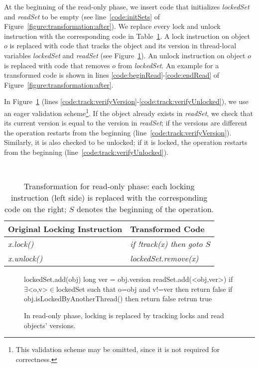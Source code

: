 At the beginning of the read-only phase, we insert code that initializes \emph{lockedSet} and \emph{readSet} to be empty (see  line~\ref{code:initSets} of Figure~\ref{figure:transformation:after}).
We replace every lock and unlock instruction with the corresponding code in Table~\ref{Ta:readOnlyTransformation}.
A lock instruction on object $o$ is replaced with code that tracks the object and its version in
thread-local variables \emph{lockedSet} and \emph{readSet} (see Figure~\ref{figure::track}).
An unlock instruction on object $o$ is replaced with code that removes $o$ from \emph{lockedSet}.
An example for a transformed code is shown in lines \ref{code:beginRead}-\ref{code:endRead} of Figure~\ref{figure:transformation:after}.

In Figure~\ref{figure::track} (lines \ref{code:track:verifyVersion}-\ref{code:track:verifyUnlocked}), we use an eager validation scheme\footnote{
This validation scheme may be omitted, since it is not required for correctness.
}.
If the object already exists in \emph{readSet}, we check that its current version is equal
to the version in \emph{readSet}; if the versions are different  the operation restarts from the beginning (line~\ref{code:track:verifyVersion}).
Similarly, it is also checked to be unlocked; if it is locked, the operation restarts from the beginning (line~\ref{code:track:verifyUnlocked}).



\begin{table}
\scriptsize
\ttfamily
{\tt
\begin{center}
\begin{tabular}{|l|l|}
\hline
\textbf{Original Locking Instruction} & \textbf{Transformed Code}\\
\hline
\textit{x.lock()}&
\textit{if !track(x) then goto $S$}
\\
\hline
\textit{x.unlock()}&
\textit{lockedSet.remove(x)}
\\
\hline
\end{tabular}
\end{center}
}
\caption{Transformation for read-only phase:
each locking instruction (left side) is replaced with the corresponding code on the right;
 $S$  denotes the beginning of the operation.
}
\label{Ta:readOnlyTransformation}
\end{table}

\begin{figure}
\scriptsize
\begin{algorithmic}[1]{}
		{\ttfamily
		\State{}lockedSet.add(obj) \label{code:lockedSet:add}
			\State long ver = obj.version \label{code:track:getVersion}
			\State readSet.add(<obj,ver>)
			\State if {$\exists$<o,v>$\in$lockedSet such that o=obj and v!=ver} then return false \label{code:track:verifyVersion}
			\State if {obj.isLockedByAnotherThread()} then return false \label{code:track:verifyUnlocked}
			\State retrun true
		\EndFunction
		}
\end{algorithmic}
\caption{In read-only phase, locking is replaced by
tracking locks and read
objects' versions.
\label{figure::track}}
\end{figure}


